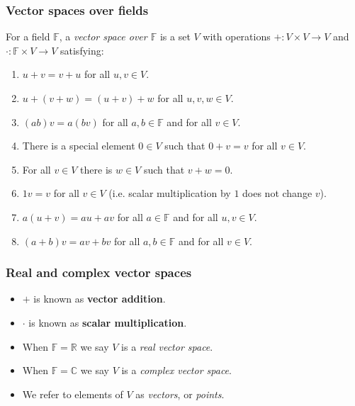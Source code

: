 \documentclass[handout]{beamer}
\newcommand{\bR}{\mathbb{R}}
\newcommand{\bC}{\mathbb{C}}
\newcommand{\bF}{\mathbb{F}}
\begin{document}
\begin{frame}
\frametitle{Vector spaces over fields}
\begin{definition}
For a field $\bF$, a \emph{vector space over $\bF$} is a set $V$ with operations $+:V\times V\to V$ and $\cdot:\bF\times V\to V$ satisfying:
\begin{enumerate}
\item $u + v = v + u$ for all $u,v\in V$.
\item $u + (v + w) = (u + v) + w$ for all $u,v,w\in V$.
\item $(ab)v = a(bv)$ for all $a,b\in\bF$ and for all $v\in V$.
\item There is a special element $0\in V$ such that $0 + v = v$ for all $v\in V$.
\item For all $v\in V$ there is $w\in V$ such that $v + w = 0$.
\item $1v = v$ for all $v\in V$ (i.e. scalar multiplication by $1$ does not change $v$).
\item $a(u+v) = au + av$ for all $a\in\bF$ and for all $u,v\in V$.
\item $(a+b)v = av + bv$ for all $a,b\in\bF$ and for all $v\in V$.
\end{enumerate}
\end{definition}
\end{frame}

\begin{frame}
\frametitle{Real and complex vector spaces}
\begin{itemize}
\item $+$ is known as \textbf{vector addition}.
\vspace{0.5cm}
\item $\cdot$ is known as \textbf{scalar multiplication}.
\vspace{0.5cm}
\item When $\bF=\bR$ we say $V$ is a \emph{real vector space}.
\vspace{0.5cm}
\item When $\bF=\bC$ we say $V$ is a \emph{complex vector space}.
\vspace{0.5cm}
\item We refer to elements of $V$ as \emph{vectors}, or \emph{points}.
\end{itemize}
\end{frame}
\end{document}
